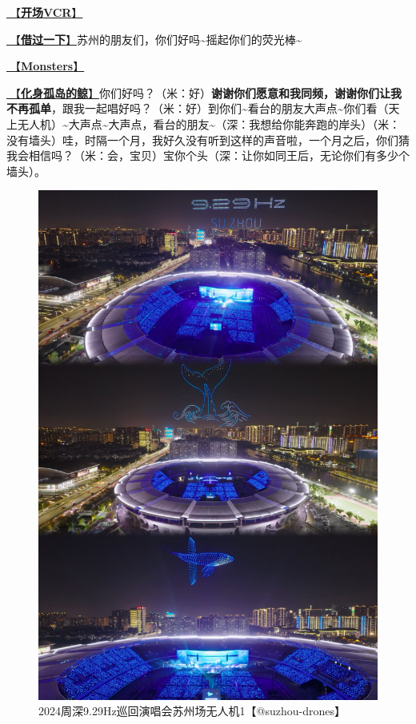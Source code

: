 \documentclass[]{ctexbook}
\begin{document}
\hyperref[opening-vcr]{🎥【\textbf{开场VCR}】}

\hyperref[I-will-go-my-way]{🎵【\textbf{借过一下}】}苏州的朋友们，你们好吗\textasciitilde 摇起你们的荧光棒\textasciitilde{}

\hyperref[Monsters]{🎵【\textbf{Monsters}】}

\hyperref[hua-shen-gu-dao-de-jing]{🎵【\textbf{化身孤岛的鲸}】}你们好吗？（米：好）\textbf{谢谢你们愿意和我同频，谢谢你们让我不再孤单}，跟我一起唱好吗？（米：好）到你们\textasciitilde 看台的朋友大声点\textasciitilde 你们看（天上无人机）\textasciitilde 大声点\textasciitilde 大声点，看台的朋友\textasciitilde（深：我想给你能奔跑的岸头）（米：没有墙头）哇，时隔一个月，我好久没有听到这样的声音啦，一个月之后，你们猜我会相信吗？（米：会，宝贝）宝你个头（深：让你如同王后，无论你们有多少个墙头）。

\begin{figure}

{\centering \includegraphics[width=400pt]{img/suzhou20241109/001} 

}

\caption{2024周深9.29Hz巡回演唱会苏州场无人机1【@suzhou-drones】}\label{fig:unnamed-chunk-127}
\end{figure}
\end{document}
